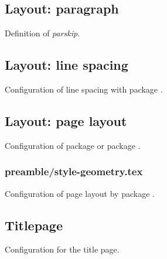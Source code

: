 \subsection{Layout: paragraph}
\label{sec:style:layout:paragraph}

Definition of \emph{parskip}.


\subsection{Layout: line spacing}
\label{sec:style:layout:linespacing}

Configuration of line spacing with package .


\subsection{Layout: page layout}
\label{sec:style:layout:page}

Configuration of package  or package .


\subsubsection{preamble/style-geometry.tex}

Configuration of page layout by package . 




\subsection{Titlepage}
\label{sec:style:titlepage}
Configuration for the title page.

